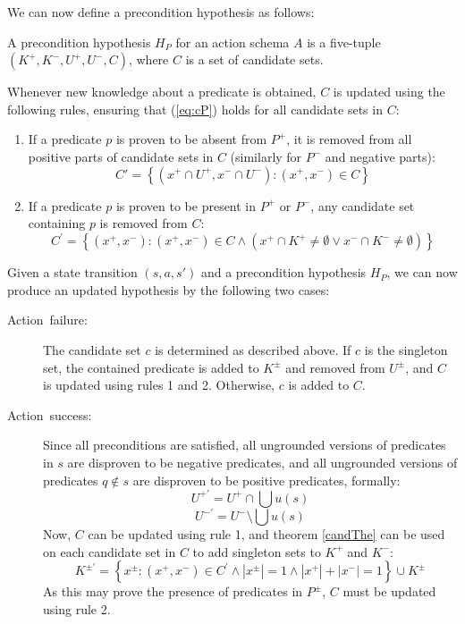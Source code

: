 \documentclass[../Master.tex]{subfiles}
\begin{document}
We can now define a precondition hypothesis as follows: \begin{defn} A
precondition hypothesis $H_{P}$ for an action schema $A$ is a five-tuple
$\left(K^{+},K^{-},U^{+},U^{-},C\right)$, where $C$ is a set of candidate sets.
\end{defn} Whenever new knowledge about a predicate is obtained, $C$ is updated
using the following rules, ensuring that (\ref{eq:cP}) holds for all candidate
sets in $C$: \begin{enumerate} \item If a predicate $p$ is proven to be absent
from $P^{+}$, it is removed from all positive parts of candidate sets in $C$
(similarly for $P^{-}$ and negative parts): \[ C'=\left\{ \left(x^{+}\cap
U^{+},x^{-}\cap U^{-}\right):\left(x^{+},x^{-}\right)\in C\right\} \]

\item If a predicate $p$ is proven to be present in $P^{+}$ or $P^{-}$, any
candidate set containing $p$ is removed from $C$: \[ C^{\prime}=\left\{
\left(x^{+},x^{-}\right):\left(x^{+},x^{-}\right)\in C\land\left(x^{+}\cap
K^{+}\neq\emptyset\lor x^{-}\cap K^{-}\neq\emptyset\right)\right\} \]

\end{enumerate} Given a state transition $\left(s,a,s'\right)$ and a
precondition hypothesis $H_{P}$, we can now produce an updated hypothesis by the
following two cases: \begin{description} \item [{Action\ failure:}] The
candidate set $c$ is determined as described above. If $c$ is the singleton set,
the contained predicate is added to $K^{\pm}$ and removed from $U^{\pm}$, and
$C$ is updated using rules 1 and 2. Otherwise, $c$ is added to $C$. \item
[{Action\ success:}] Since all preconditions are satisfied, all ungrounded
versions of predicates in $s$ are disproven to be negative predicates, and all
ungrounded versions of predicates $q\notin s$ are disproven to be positive
predicates, formally: \[ U^{+\prime}=U^{+}\cap\bigcup u\left(s\right) \] \[
U^{-\prime}=U^{-}\setminus\bigcup u\left(s\right) \] Now, $C$ can be updated
using rule 1, and theorem \ref{candThe} can be used on each candidate set in $C$
to add singleton sets to $K^{+}$ and $K^{-}$: \[ K^{\pm\prime}=\left\{
x^{\pm}:\left(x^{+},x^{-}\right)\in
C^{\prime}\land\left|x^{\pm}\right|=1\land\left|x^{+}\right|+\left|x^{-}\right|=1\right\}
\cup K^{\pm} \] As this may prove the presence of predicates in $P^{\pm}$, $C$
must be updated using rule 2. \end{description}
\end{document}
